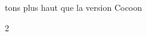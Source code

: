\textonehalf{} tons plus haut que la version Cocoon


\newpage

\begin{multicols}{2}
	\songlyrics

\end{multicols}
